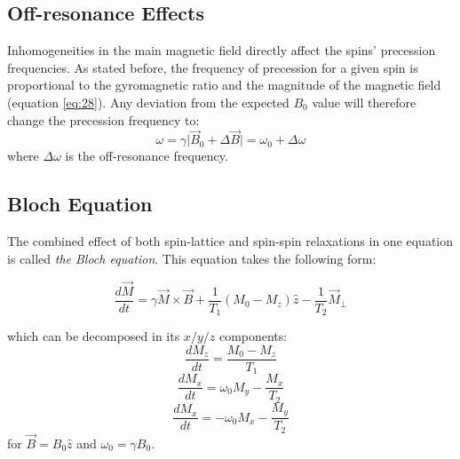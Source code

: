 \hfill

\subsection{Off-resonance Effects}

Inhomogeneities in the main magnetic field directly affect the spins' precession frequencies.
As stated before, the frequency of precession for a given spin is proportional to the gyromagnetic ratio and the magnitude of the magnetic field (equation \ref{eq:28}).
Any deviation from the expected $B_0$ value will therefore change the precession frequency to:
\begin{equation}\label{eq:omegaEffects}
    \omega = \gamma \lvert \vec{B}_0 + \Delta \vec{B} \rvert = \omega_0 + \Delta \omega
\end{equation}
where $\Delta \omega$ is the off-resonance frequency.

\hfill

\subsection{Bloch Equation}
\label{chapterlabel2sec1Bloch}

The combined effect of both spin-lattice and spin-spin relaxations in one equation is called \textit{the Bloch equation}. 
This equation takes the following form:

\begin{equation} \label{eq:421}
    \frac{d\vec{M}}{dt} = \gamma \vec{M} \times \vec{B} + \frac{1}{T_1} (M_0 - M_z) \hat{z} - \frac{1}{T_2} \vec{M}_{\perp}
\end{equation} 

which can be decomposed in its $x/y/z$ components:
\begin{equation} \label{eq:422}
    \frac{dM_z}{dt} = \frac{M_0 - M_z}{T_1}
\end{equation}
\begin{equation} \label{eq:423}
    \frac{dM_x}{dt} = \omega_0 M_y - \frac{M_x}{T_2}
\end{equation}
\begin{equation} \label{eq:424}
    \frac{dM_x}{dt} = -\omega_0 M_x - \frac{M_y}{T_2}
\end{equation}
for $\vec{B} = B_0 \hat{z}$ and $\omega_0 = \gamma B_0$.

\hfill

